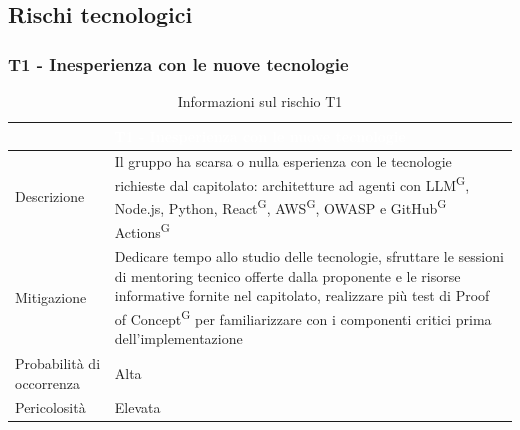 \documentclass[a4paper, 11pt]{article}
\begin{document}
\newpage

\subsection{Rischi tecnologici}

\subsubsection{T1 - Inesperienza con le nuove tecnologie}
\begin{table}[H]
    \centering
    \begin{tabular}{|p{}|p{}|}
    	\hline
    	\multicolumn{2}{|c|}{\cellcolor{AccentColor}\textcolor{white}{\textbf{T1 - Inesperienza con le nuove tecnologie}}} \\ 
        \hline
        Descrizione & Il gruppo ha scarsa o nulla esperienza con le tecnologie richieste dal capitolato: architetture ad agenti con LLM\textsuperscript{G}, Node.js, Python, React\textsuperscript{G}, AWS\textsuperscript{G}, OWASP e GitHub\textsuperscript{G} Actions\textsuperscript{G} \\ 
        \hline
        Mitigazione & Dedicare tempo allo studio delle tecnologie, sfruttare le sessioni di mentoring tecnico offerte dalla proponente e le risorse informative fornite nel capitolato, realizzare più test di Proof of Concept\textsuperscript{G} per familiarizzare con i componenti critici prima dell'implementazione \\ 
        \hline
        Probabilità di occorrenza & Alta \\
        \hline
        Pericolosità & Elevata \\
        \hline
    \end{tabular}
    \caption{Informazioni sul rischio T1}
\end{table}
\end{document}
